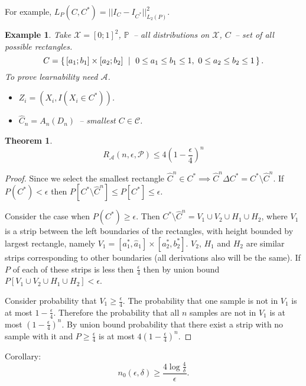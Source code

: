 \documentclass[10pt]{article}
\newcounter{lecnum}
\newtheorem{theorem}{Theorem}[lecnum]
\newtheorem{example}[ex]{Example}
\renewcommand{\P}{\mathbb{P}}
\newcommand{\X}{\mathcal{X}}
\renewcommand{\hat}{\widehat}
\newcommand{\A}{\mathcal{A}}
\newcommand{\Pcal}{\mathcal{P}}
\newcommand{\C}{\mathcal{C}}
\begin{document}
For example, $L_P(C,C^*) = ||I_C - I_{C^*}||^2_{L_2(P)}$.

\begin{example}
  Take $\X = [0;1]^2$, $\P$~-- all distributions on $\X$, $C$~-- set of all possible rectangles.
  \[C = \set{[a_1; b_1] \times [a_2; b_2]\ |\ 0 \leq a_1 \leq b_1 \leq 1,\ 0 \leq a_2 \leq b_2 \leq 1}.\]
  To prove learnability need $\A$.
  \begin{itemize}
    \item $Z_i = (X_i, I(X_i \in C^*))$.
    \item $\hat C_n = A_n(D_n)$~-- smallest $C \in \C$.
  \end{itemize}
\end{example}

\begin{theorem}
  \[R_\A(n,\epsilon,\Pcal) \leq 4 \left(1 - \frac \epsilon 4\right)^n\]
\end{theorem}
\begin{proof}
  Since we select the smallest rectangle $\hat C^n \in C^* \implies \hat C^n \Delta C^* = C^* \setminus \hat C^n$.
  If $P(C^*) < \epsilon$ then $P[C^* \setminus \hat C^n] \leq P[C^*] \leq \epsilon$.

  Consider the case when $P(C^*) \geq \epsilon$. Then $C^* \setminus \hat C^n = V_1 \cup V_2 \cup H_1 \cup H_2$,
    where $V_1$ is a strip between the left boundaries of the rectangles, with height bounded by largest rectangle, namely
    $V_1 = [a_1^*, \hat a_1] \times [a_2^*, b_2^*]$.
    $V_2$, $H_1$ and $H_2$ are similar strips corresponding to other boundaries (all derivations also will be the same).
    If $P$ of each of these strips is less then $\frac \epsilon 4$ then by union bound $P[V_1 \cup V_2 \cup H_1 \cup H_2] < \epsilon$.

  Consider probability that $V_1 \geq \frac \epsilon 4$. The probability that one sample is not in $V_1$ is at most $1 - \frac \epsilon 4$.
  Therefore the probability that all $n$ samples are not in $V_1$ is at most $\left(1 - \frac \epsilon 4\right)^n$.
  By union bound probability that there exist a strip with no sample with it and $P \geq \frac \epsilon 4$ is at most $4 \left(1 - \frac \epsilon 4\right)^n$.
\end{proof}
Corollary: \[n_0(\epsilon, \delta) \geq \frac {4 \log \frac 4 \delta} \epsilon.\]
\end{document}
